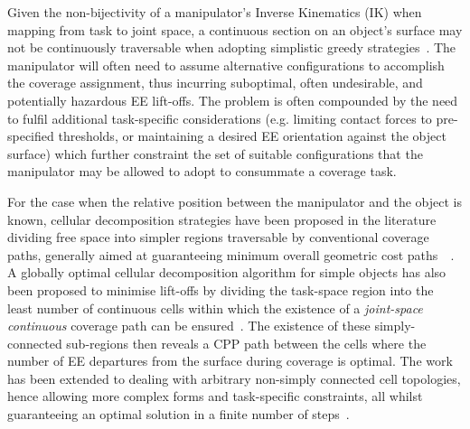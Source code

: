 \documentclass[letterpaper,journal]{IEEEtran}
\begin{document}
Given the non-bijectivity of a manipulator's Inverse Kinematics (IK) when mapping from task to joint space, a continuous section on an object's surface may not be continuously traversable when adopting simplistic greedy strategies~\cite{Yang2020Cellular}. The manipulator will often need to assume alternative configurations to accomplish the coverage assignment, thus incurring suboptimal, often undesirable, and potentially hazardous EE lift-offs. The problem is often compounded by the need to fulfil additional task-specific considerations (e.g. limiting contact forces to pre-specified thresholds, or maintaining a desired EE orientation against the object surface) which further constraint the set of suitable configurations that the manipulator may be allowed to adopt to consummate a coverage task. 


For the case when the relative position between the manipulator and the object is known, cellular decomposition strategies have been proposed in the literature dividing free space into simpler regions traversable by conventional coverage paths, generally aimed at guaranteeing minimum overall geometric cost paths~\cite{choset2000exact}~\cite{Acar2002Morse}. 
A globally optimal cellular decomposition algorithm for simple objects has also been proposed to minimise lift-offs by dividing the task-space region into the least number of continuous cells within which the existence of a \textit{joint-space continuous} coverage path can be ensured~\cite{Yang2020Cellular}. The existence of these simply-connected sub-regions then reveals a CPP path between the cells where the number of EE departures from the surface during coverage is optimal. 
The work has been extended to dealing with arbitrary non-simply connected cell topologies, hence allowing more complex forms and task-specific constraints, all whilst guaranteeing an optimal solution in a finite number of steps~\cite{Yang2020Nonrevisiting}.
\end{document}
